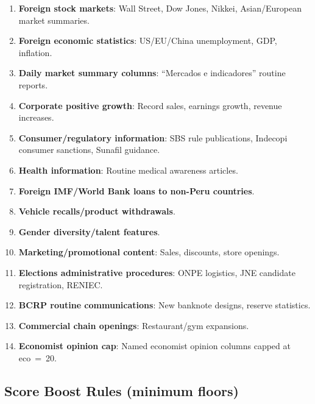 \documentclass[12pt,a4paper]{article}
\begin{document}
\begin{enumerate}
  \item \textbf{Foreign stock markets}: Wall Street, Dow Jones, Nikkei,
    Asian/European market summaries.
  \item \textbf{Foreign economic statistics}: US/EU/China unemployment,
    GDP, inflation.
  \item \textbf{Daily market summary columns}: ``Mercados e indicadores''
    routine reports.
  \item \textbf{Corporate positive growth}: Record sales, earnings growth,
    revenue increases.
  \item \textbf{Consumer/regulatory information}: SBS rule publications,
    Indecopi consumer sanctions, Sunafil guidance.
  \item \textbf{Health information}: Routine medical awareness articles.
  \item \textbf{Foreign IMF/World Bank loans to non-Peru countries}.
  \item \textbf{Vehicle recalls/product withdrawals}.
  \item \textbf{Gender diversity/talent features}.
  \item \textbf{Marketing/promotional content}: Sales, discounts,
    store openings.
  \item \textbf{Elections administrative procedures}: ONPE logistics,
    JNE candidate registration, RENIEC.
  \item \textbf{BCRP routine communications}: New banknote designs,
    reserve statistics.
  \item \textbf{Commercial chain openings}: Restaurant/gym expansions.
  \item \textbf{Economist opinion cap}: Named economist opinion columns
    capped at eco~=~20.
\end{enumerate}

\subsection*{Score Boost Rules (minimum floors)}
\end{document}
